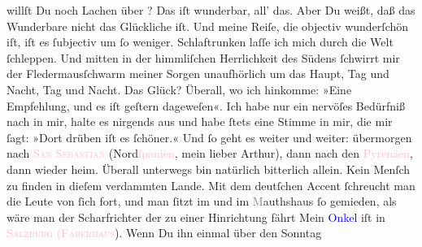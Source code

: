                willſt Du noch Lachen über \label{K_L02701-5v}\label{K_L02701-5h}?\pend
           \pstart
           Das iſt wunderbar, all’ das. Aber Du {\pb}weißt, daß das
               Wunderbare nicht das Glückliche iſt. Und meine Reiſe, die objectiv wunderſchön iſt,
               iſt es ſubjectiv um ſo weniger. Schlaftrunken laſſe ich mich durch die Welt
               ſchleppen. Und mitten in der himmliſchen Herrlichkeit des Südens ſchwirrt mir der
               Fledermausſchwarm meiner Sorgen unaufhörlich um das Haupt, Tag und Nacht, Tag und
               Nacht. Das Glück? Überall, wo ich hinkomme: »Eine Empfehlung, {\pb}und es iſt geſtern dageweſen«. Ich habe nur ein
               nervöſes Bedürfniß nach \label{K_L02701-2v}\label{K_L02701-2h} in mir, halte es
               nirgends aus und habe ſtets eine Stimme in mir, die mir ſagt: »Dort drüben iſt es
               ſchöner.« Und ſo geht es weiter und weiter: übermorgen
               nach \textsc{\textcolor{pink}{San Sebastian}{}\ledrightnote{\textcolor{pink}{San Sebastian}}} (Nord\textcolor{pink}{ſpanien}{}\ledrightnote{\textcolor{pink}{Spanien}}, mein lieber Arthur), dann
               nach den \textcolor{pink}{Pyrenäen}{}\ledrightnote{\textcolor{pink}{Pyrenees}}, dann wieder heim. Überall
               unterwegs bin natürlich {\pb}bitterlich allein. Kein
               Menſch zu finden in dieſem verdammten Lande. Mit dem deutſchen Accent ſchreucht man
               die Leute von ſich fort,  und man ſitzt im \label{K_L02701-3v}\label{K_L02701-3h} und im
                  \textcolor{gray}{M}authshaus ſo gemieden, als wäre man der Scharfrichter der zu
               einer Hinrichtung fährt{\dotsfour}\pend
           \pstart
           Mein \textcolor{blue}{Onkel}{} iſt in \textsc{\textcolor{pink}{Salzburg}{}\ledrightnote{\textcolor{pink}{Salzburg}}}{ }\textsc{\textcolor{pink}{(Faberhaus}{}\ledrightnote{\textcolor{pink}{Faberhäuser}}}). {\pb} Wenn Du ihn einmal über den Sonntag
